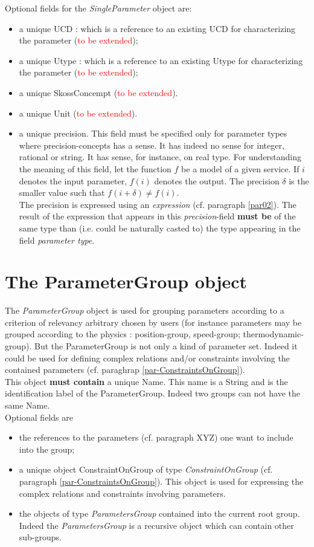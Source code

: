 \documentclass[a4paper,11pt] {article}
\begin{document}
Optional fields for the {\it SingleParameter} object are:
\begin{itemize}
\item a unique UCD : which is a reference to an existing UCD for characterizing the parameter (\textcolor{red}{to be extended});
\item a unique Utype  : which is a reference to an existing Utype for characterizing the parameter (\textcolor{red}{to be extended});
\item a unique SkossConcempt (\textcolor{red}{to be extended}).
\item a unique Unit (\textcolor{red}{to be extended}).
\item a unique precision. This field must be specified only for parameter types where precision-concepts has a sense. It has indeed no sense for integer, rational or string. It has sense, for instance, on real type. For understanding the meaning of this field, let the function $f$ be a model of a given service. If $i$ denotes the input parameter, $f(i)$ denotes the output. The precision $\delta$ is the smaller value such that $f(i+\delta) \neq f(i)$.\\ The precision is expressed using an {\it expression} (cf. paragraph \ref{par02}). The result of the expression that appears in this {\it precision}-field  {\bf must be} of the same type than (i.e. could be naturally casted to) the type appearing in the field {\it parameter type}.
\end{itemize}

\section{The ParameterGroup object}\label{par-group}
The {\it ParameterGroup} object is used for grouping parameters according to a criterion of relevancy arbitrary chosen by users (for instance parameters may be grouped according to the physics : position-group, speed-group; thermodynamic-group).
But  the ParameterGroup is not only a kind of parameter set. Indeed it could be used for defining complex relations and/or constraints involving the contained parameters (cf. paraghrap \ref{par-ConstraintsOnGroup}).\\
This object {\bf must contain} a unique Name. This name is a String and is the identification label of the ParameterGroup. Indeed two groups can not have the same Name.\\
Optional fields are
\begin{itemize}
\item the references to the parameters (cf. paragraph XYZ) one want to include into the group;
\item a unique object ConstraintOnGroup of type {\it ConstraintOnGroup} (cf. paragraph  \ref{par-ConstraintsOnGroup}). This object is used for 
expressing the complex relations and constraints involving parameters.
\item the objects of type {\it ParametersGroup} contained into the current root group. Indeed the {\it ParametersGroup} is a recursive object which can contain other sub-groups.
\end{itemize}
\end{document}
